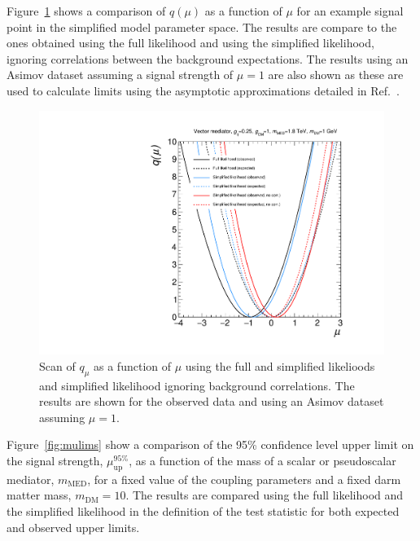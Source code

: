 Figure~\ref{fig:lhscan-mj} shows a comparison of $q(\mu)$ as a function of $\mu$ for an example signal point in the simplified model parameter space. 
The results are compare to the ones obtained using 
the full likelihood and using the simplified likelihood, ignoring correlations between the background expectations. The results using an Asimov dataset assuming a signal 
strength of $\mu=1$ are also shown as these are used to calculate limits using the asymptotic approximations detailed in Ref.~\cite{Cowan:2010js}. 


\begin{figure}[hbt!]
  \begin{center} 
   \includegraphics[width=1.5\cmsFigWidth]{figures/compare_mj_likelihoods.pdf}
   \caption{Scan of $q_{\mu}$ as a function of $\mu$ using the full and simplified likelioods and simplified likelihood ignoring background correlations. 
   The results are shown for the observed data and using an Asimov dataset assuming $\mu=1$.}
   \label{fig:lhscan-mj} 
  \end{center}
\end{figure}


Figure~\ref{fig:mulims} show a comparison of the 95\% confidence level upper limit on the signal strength, $\mu_{\mathrm{up}}^{95\%}$, as a function of 
the mass of a scalar or pseudoscalar mediator, $m_{\mathrm{MED}}$, for a fixed value of the coupling parameters and a fixed darm matter mass, $m_{\mathrm{DM}}=10$\GeV. 
The results are compared using the full likelihood and the simplified likelihood in the definition of the test statistic for both expected and observed upper limits. 


